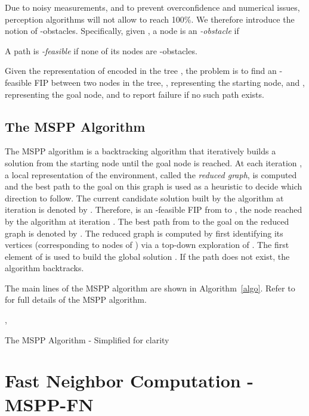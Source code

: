 \documentclass[letterpaper, 10 pt, conference]{ieeeconf}
\theoremstyle{definition}
\begin{document}
Due to noisy measurements, and to prevent overconfidence and numerical issues, perception algorithms will not allow  to reach 100\%. We therefore introduce the notion of -obstacles.
Specifically, given , a node  is an \textit{-obstacle} if

A path  is \textit{-feasible} if none of its nodes are -obstacles.

Given the representation of  encoded in the tree ,
the problem is to find an -feasible FIP between two nodes in the tree, , representing the starting node, and , representing the goal node, and to report failure if no such path exists.

\subsection{The MSPP Algorithm}

The MSPP algorithm is a backtracking algorithm that iteratively builds a solution from the starting node  until the goal node  is reached.
At each iteration , a local representation  of the environment, called the \textit{reduced graph}, is computed and the best path to the goal on this graph is used as a heuristic to decide which direction to follow.
The current candidate solution built by the algorithm at iteration  is denoted by .
Therefore,  is an -feasible FIP from  to , the node reached by the algorithm at iteration .
The best path from  to the goal on the reduced graph  is denoted by .
The reduced graph
 is computed by first identifying its vertices (corresponding to nodes of ) via a top-down exploration of .
The first element of  is used to build the global solution . If the path  does not exist, the algorithm backtracks.

The main lines of the MSPP algorithm are shown in Algorithm~\ref{algo}. Refer to \cite{hauer2015multi} for full details of the MSPP algorithm.

\begin{algorithm}[ht]
 ,\;
 \caption{The MSPP Algorithm - Simplified for clarity}
 \label{algo}
\end{algorithm}

\section{Fast Neighbor Computation - MSPP-FN}
\end{document}

